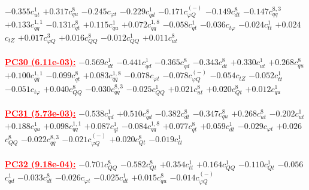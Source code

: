\documentclass{article}
\begin{document}
{$-0.355$}{\rm $c_{ut}^{1}$} 
{$+0.317$}{\rm $c_{qu}^{8}$} 
{$-0.245$}{\rm $c_{\varphi t}$} 
{$-0.229$}{\rm $c_{qd}^{1}$} 
{$-0.171$}{\rm $c_{\varphi Q}^{(-)}$} 
{$-0.149$}{\rm $c_{dt}^{8}$} 
{$-0.147$}{\rm $c_{qq}^{8,3}$} 
{$+0.133$}{\rm $c_{qq}^{1,1}$} 
{$-0.131$}{\rm $c_{qt}^{8}$} 
{$+0.115$}{\rm $c_{qu}^{1}$} 
{$+0.072$}{\rm $c_{qq}^{1,8}$} 
{$-0.058$}{\rm $c_{qt}^{1}$} 
{$-0.036$}{\rm $c_{t \varphi}$} 
{$-0.024$}{\rm $c_{tt}^{1}$} 
{$+0.024$}{\rm $c_{tZ}$} 
{$+0.017$}{\rm $c_{\varphi Q}^{3}$} 
{$+0.016$}{\rm $c_{QQ}^{8}$} 
{$-0.012$}{\rm $c_{QQ}^{1}$} 
{$+0.011$}{\rm $c_{ut}^{8}$} 
 \nonumber \\ \nonumber \\ 
\noindent \textcolor{red}{\underline{\bf{PC30} (6.11e-03):}}
{$-0.569$}{\rm $c_{dt}^{1}$} 
{$-0.441$}{\rm $c_{qd}^{1}$} 
{$-0.365$}{\rm $c_{qd}^{8}$} 
{$-0.343$}{\rm $c_{dt}^{8}$} 
{$+0.330$}{\rm $c_{ut}^{1}$} 
{$+0.268$}{\rm $c_{qu}^{8}$} 
{$+0.100$}{\rm $c_{qq}^{1,1}$} 
{$-0.099$}{\rm $c_{qt}^{8}$} 
{$+0.083$}{\rm $c_{qq}^{1,8}$} 
{$-0.078$}{\rm $c_{\varphi t}$} 
{$-0.078$}{\rm $c_{\varphi Q}^{(-)}$} 
{$-0.054$}{\rm $c_{tZ}$} 
{$-0.052$}{\rm $c_{tt}^{1}$} 
{$-0.051$}{\rm $c_{t \varphi}$} 
{$+0.040$}{\rm $c_{QQ}^{8}$} 
{$-0.030$}{\rm $c_{qq}^{8,3}$} 
{$-0.025$}{\rm $c_{QQ}^{1}$} 
{$+0.021$}{\rm $c_{ut}^{8}$} 
{$+0.020$}{\rm $c_{Qt}^{8}$} 
{$+0.012$}{\rm $c_{qu}^{1}$} 
 \nonumber \\ \nonumber \\ 
\noindent \textcolor{red}{\underline{\bf{PC31} (5.73e-03):}}
{$-0.538$}{\rm $c_{qd}^{1}$} 
{$+0.510$}{\rm $c_{qd}^{8}$} 
{$-0.382$}{\rm $c_{dt}^{8}$} 
{$-0.347$}{\rm $c_{qu}^{8}$} 
{$+0.268$}{\rm $c_{ut}^{8}$} 
{$-0.202$}{\rm $c_{ut}^{1}$} 
{$+0.188$}{\rm $c_{qu}^{1}$} 
{$+0.098$}{\rm $c_{qq}^{1,1}$} 
{$+0.087$}{\rm $c_{qt}^{1}$} 
{$-0.084$}{\rm $c_{qq}^{1,8}$} 
{$+0.077$}{\rm $c_{qt}^{8}$} 
{$+0.059$}{\rm $c_{dt}^{1}$} 
{$-0.029$}{\rm $c_{\varphi t}$} 
{$+0.026$}{\rm $c_{QQ}^{8}$} 
{$-0.022$}{\rm $c_{qq}^{8,3}$} 
{$-0.021$}{\rm $c_{\varphi Q}^{(-)}$} 
{$+0.020$}{\rm $c_{Qt}^{8}$} 
{$-0.019$}{\rm $c_{tt}^{1}$} 
 \nonumber \\ \nonumber \\ 
\noindent \textcolor{red}{\underline{\bf{PC32} (9.18e-04):}}
{$-0.701$}{\rm $c_{QQ}^{8}$} 
{$-0.582$}{\rm $c_{Qt}^{8}$} 
{$+0.354$}{\rm $c_{tt}^{1}$} 
{$+0.164$}{\rm $c_{QQ}^{1}$} 
{$-0.110$}{\rm $c_{Qt}^{1}$} 
{$-0.056$}{\rm $c_{qd}^{1}$} 
{$-0.033$}{\rm $c_{dt}^{8}$} 
{$-0.026$}{\rm $c_{\varphi t}$} 
{$-0.025$}{\rm $c_{dt}^{1}$} 
{$+0.015$}{\rm $c_{qu}^{8}$} 
{$-0.014$}{\rm $c_{\varphi Q}^{(-)}$} 
\end{document}
